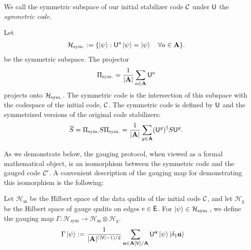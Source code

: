 \documentclass[11pt]{article}
\begin{document}
We call the symmetric subspace of our initial stabilizer code $\mathcal{C}$ under $\mathsf{U}$ the \textit{symmetric code}. 

\begin{definition}
\label{def:symmetric-code}
Let
\begin{align}
    \mathcal H_{\rm sym.} := \{\ket{\psi} : \mathsf{U}^a\ket{\psi}=\ket{\psi} \quad \forall a\in \mathbf{A}\}.
\end{align}
be the symmetric subspace. The projector
\begin{align}
    \Pi_{\rm sym.} = \frac{1}{|\mathbf{A}|} \sum_{a \in \mathbf{A}} \mathsf{U}^a
\end{align}
projects onto $\mathcal H_{\rm sym.}$. The symmetric code is the intersection of this subspace with the codespace of the initial code, $\mathcal{C}$. The symmetric code is defined by $\mathsf{U}$ and the symmetrized versions of the original code stabilizers: 
\begin{equation}
    \overline{S} = \Pi_{\rm sym.} S \Pi_{\rm sym.} = \frac{1}{|\mathbf{A}|} \sum_{g \in \mathbf{A}} (\mathsf{U}^g)^\dagger S \mathsf{U}^g.
\end{equation}
\end{definition}

As we demonstrate below, the gauging protocol, when viewed as a formal mathematical object, is an isomorphism between the symmetric code and the gauged code $\mathcal{C}'$. A convenient description of the gauging map for demonstrating this isomorphism is the following:

\begin{definition}
\label{def:gauging-map}
Let $\mathcal{H}_\mathrm{m}$ be the Hilbert space of the data qudits of the initial code $\mathcal{C}$, and let $\mathcal{H}_\mathrm{g}$ be the Hilbert space of gauge qudits on edges $e\in \mathsf{E}$.
For $\ket{\psi}\in \mathcal H_{\rm sym.}$, we define the gauging map $\Gamma:\mathcal{H}_\mathrm{sym}\rightarrow \mathcal{H}_\mathrm{m}\otimes \mathcal{H}_\mathrm{g}$. 
\begin{align}
\label{eq:gauging-map}
     \Gamma \ket{\psi} &:= \frac{1}{|\mathbf{A}|^{(|\mathsf{V}|-1)/2}}\sum_{\bm{a}\in \mathbf{A}[\mathsf{V}]/\mathbf{A}} \mathsf{U}^{\bm{a}} \ket{\psi}\ket{\delta_1\bm{a}}
\end{align}
\end{definition}
\end{document}
